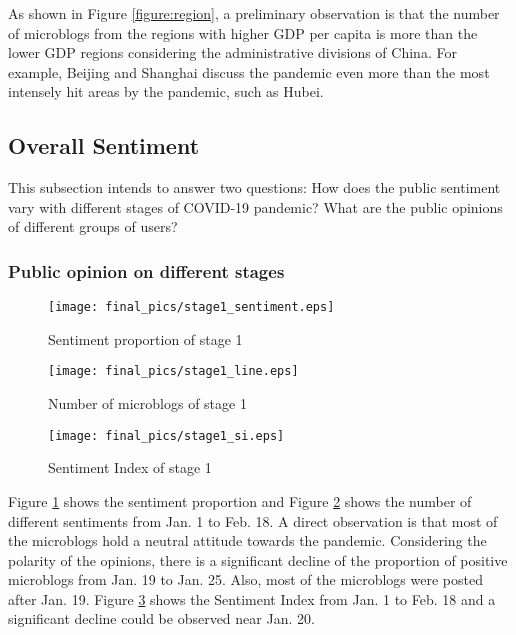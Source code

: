 \documentclass[sigconf, nonacm=true]{acmart}
\begin{document}
As shown in Figure \ref{figure:region}, a preliminary observation is that the number of microblogs from the regions with higher GDP per capita is more than the lower GDP regions considering the administrative divisions of China.
For example, Beijing and Shanghai discuss the pandemic even more than the most intensely hit areas by the pandemic, such as Hubei.

\subsection{Overall Sentiment}
This subsection intends to answer two questions:
How does the public sentiment vary with different stages of COVID-19 pandemic?
What are the public opinions of different groups of users?
\vspace{-0.2cm}
\subsubsection{Public opinion on different stages}
\label{Public opinion on different stages}
\begin{figure}[t]
  \texttt{[image: final\_pics/stage1\_sentiment.eps]}
  \vspace{-0.3cm}
  \caption{Sentiment proportion of stage 1}
  \vspace{-0.3cm}
  \label{figure:stage1_sentiment}
\end{figure}

\begin{figure}[t]
  \texttt{[image: final\_pics/stage1\_line.eps]}
  \vspace{-0.3cm}
  \caption{Number of microblogs of stage 1}
  \vspace{-0.3cm}
  \label{figure:stage1_line}
\end{figure}
\begin{figure}[t]
  \texttt{[image: final\_pics/stage1\_si.eps]}
  \vspace{-0.3cm}
  \caption{Sentiment Index of stage 1}
  \vspace{-0.3cm}
  \label{figure:stage1_si}
\end{figure}
Figure \ref{figure:stage1_sentiment} shows the sentiment proportion and Figure \ref{figure:stage1_line} shows the number of different sentiments from Jan. 1 to Feb. 18.
A direct observation is that most of the microblogs hold a neutral attitude towards the pandemic.
Considering the polarity of the opinions, there is a significant decline of the proportion of positive microblogs from Jan. 19 to Jan. 25.
Also, most of the microblogs were posted after Jan. 19.
Figure \ref{figure:stage1_si} shows the Sentiment Index from Jan. 1 to Feb. 18 and a significant decline could be observed near Jan. 20.
\end{document}
